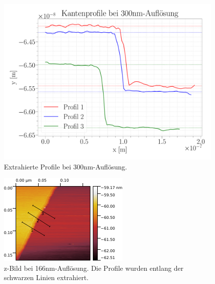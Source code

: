 \begin{figure}[H]
\centering
\includegraphics[width=\textwidth]{../Figures/300nm_profiles.pdf}
\caption{Extrahierte Profile bei {300}{nm}-Auflösung.}
\label{300nmProfiles}
\end{figure}	

\begin{figure}[H]
\centering
\includegraphics[width=\textwidth]{../Gwyddion/HOPG/166nm.pdf}
\caption{z-Bild bei {166}{nm}-Auflösung. Die Profile wurden entlang der schwarzen Linien extrahiert.}
\label{166nm}
\end{figure}

